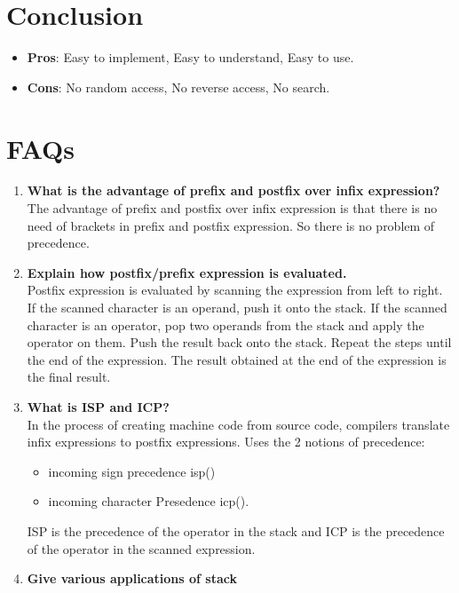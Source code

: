 \documentclass[11pt]{article}
\begin{document}
\section{Conclusion}
\begin{itemize}
	\item \textbf{Pros}: Easy to implement, Easy to understand, Easy to use.
	\item \textbf{Cons}: No random access, No reverse access, No search.
\end{itemize}


\section{FAQs}
\begin{enumerate}
	\item \textbf{What is the advantage of prefix and postfix over infix expression?}\\

	      The advantage of prefix and postfix over infix expression is that there is no need of brackets in prefix and postfix expression. So there is no problem of precedence.
	\item \textbf{Explain how postfix/prefix expression is evaluated.}\\

	      Postfix expression is evaluated by scanning the expression from left to right. If the scanned character is an operand, push it onto the stack. If the scanned character is an operator, pop two operands from the stack and apply the operator on them. Push the result back onto the stack. Repeat the steps until the end of the expression. The result obtained at the end of the expression is the final result.

	\item \textbf{What is ISP and ICP?}\\
	      In the process of creating machine code from source code, compilers translate infix expressions to postfix expressions.
	      Uses the 2 notions of precedence:
	      \begin{itemize}
		      \item incoming sign precedence isp()
		      \item incoming character Presedence icp().
	      \end{itemize}
	      ISP is the precedence of the operator in the stack and ICP is the precedence of the operator in the scanned expression.

	\item \textbf{Give various applications of stack}\\


\end{enumerate}
\end{document}
